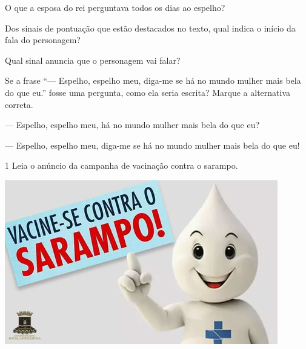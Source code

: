 \begin{escolha}
\item
  O que a esposa do rei perguntava todos os dias ao espelho?



\item
  Dos sinais de pontuação que estão destacados no texto, qual indica o
  início da fala do personagem?


\item
  Qual sinal anuncia que o personagem vai falar?


\item Se a frase ``--- Espelho, espelho meu, diga-me se há no mundo mulher
mais bela do que eu.'' fosse uma pergunta, como ela seria escrita?
Marque a alternativa correta.

\begin{boxlist}
\boxitem[X] --- Espelho, espelho meu, há no mundo mulher mais bela do que eu?

\boxitem[] --- Espelho, espelho meu, diga-me se há no mundo mulher mais bela do que eu!
\end{boxlist}
\end{escolha}


\num{1} Leia o anúncio da campanha de vacinação contra o sarampo.


\includegraphics[width=4.68681in,height=2.81736in]{./media/image7.jpeg}

